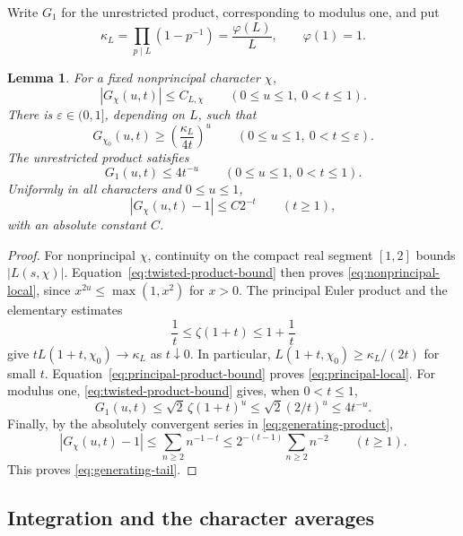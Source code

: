 \documentclass[11pt,reqno]{amsart}
\newtheorem{lemma}[theorem]{Lemma}
\theoremstyle{definition}
\theoremstyle{remark}
\numberwithin{equation}{section}
\begin{document}
Write $G_1$ for the unrestricted product, corresponding to modulus one,
and put
\[
 \kappa_L=\prod_{p\mid L}(1-p^{-1})=\frac{\varphi(L)}L,
 \qquad \varphi(1)=1.
\]

\begin{lemma}\label{lem:generating-bounds}
For a fixed nonprincipal character $\chi$,
\begin{equation}\label{eq:nonprincipal-local}
 |G_\chi(u,t)|\leq C_{L,\chi}
 \qquad(0\leq u\leq1,\ 0<t\leq1).
\end{equation}
There is $\varepsilon\in(0,1]$, depending on $L$, such that
\begin{equation}\label{eq:principal-local}
 G_{\chi_0}(u,t)\geq\left(\frac{\kappa_L}{4t}\right)^u
 \qquad(0\leq u\leq1,\ 0<t\leq\varepsilon).
\end{equation}
The unrestricted product satisfies
\begin{equation}\label{eq:unrestricted-local}
 G_1(u,t)\leq4t^{-u}
 \qquad(0\leq u\leq1,\ 0<t\leq1).
\end{equation}
Uniformly in all characters and $0\leq u\leq1$,
\begin{equation}\label{eq:generating-tail}
 |G_\chi(u,t)-1|\leq C2^{-t}\qquad(t\geq1),
\end{equation}
with an absolute constant $C$.
\end{lemma}

\begin{proof}
For nonprincipal $\chi$, continuity on the compact real segment $[1,2]$
bounds $|L(s,\chi)|$. Equation~\eqref{eq:twisted-product-bound} then
proves \eqref{eq:nonprincipal-local}, since $x^{2u}\leq\max(1,x^2)$
for $x>0$. The principal Euler product and the elementary estimates
\[
 \frac1t\leq\zeta(1+t)\leq1+\frac1t
\]
give $tL(1+t,\chi_0)\to\kappa_L$ as $t\downarrow0$.
In particular, $L(1+t,\chi_0)\geq\kappa_L/(2t)$ for small $t$.
Equation~\eqref{eq:principal-product-bound} proves
\eqref{eq:principal-local}. For modulus one,
\eqref{eq:twisted-product-bound} gives, when $0<t\leq1$,
\[
 G_1(u,t)\leq\sqrt2\,\zeta(1+t)^u
 \leq\sqrt2(2/t)^u\leq4t^{-u}.
\]
Finally, by the absolutely convergent series in
\eqref{eq:generating-product},
\[
 |G_\chi(u,t)-1|\leq\sum_{n\geq2}n^{-1-t}
 \leq2^{-(t-1)}\sum_{n\geq2}n^{-2}\qquad(t\geq1).
\]
This proves \eqref{eq:generating-tail}.
\end{proof}

\subsection{Integration and the character averages}
\end{document}
